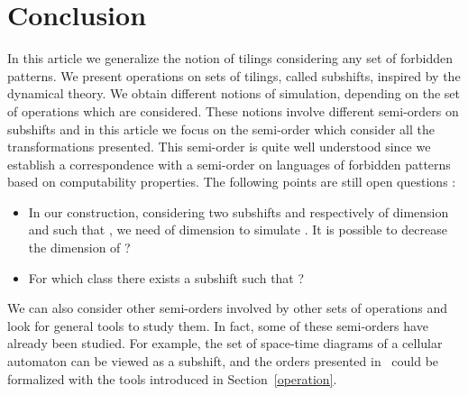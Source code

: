 \documentclass[proceedings]{stacs}
\theoremstyle{plain}\newtheorem{satz}[thm]{Satz}
\theoremstyle{definition}\newtheorem{crucial}[thm]{Crucial Definition}
\begin{document}
\section*{Conclusion}

In this article we generalize the notion of tilings considering any set of forbidden patterns. We present operations on sets of tilings, called subshifts, inspired by the dynamical theory. We obtain different notions of simulation, depending on the set of operations which are considered. These notions involve different semi-orders on subshifts and in this article we focus on the semi-order which consider all the transformations presented. This semi-order is quite well understood since we establish a correspondence with a semi-order on languages of forbidden patterns based on computability properties. The following points are still open questions :
\begin{itemize}
 \item In our construction, considering two subshifts  and  respectively of dimension  and  such that , we need  of dimension  to simulate . It is possible to decrease the dimension of ?

 \item For which class  there exists a subshift  such that ?
\end{itemize}

We can also consider other semi-orders involved by other sets of operations and look for general tools to study them. In fact, some of these semi-orders have already been studied. For example, the set of space-time diagrams of a cellular automaton can be viewed as a subshift, and the orders presented in~\cite{mazoyer1999ioc,ollinger2003stacs,theyssier2005acm} could be formalized with the tools introduced in Section~\ref{operation}. 




\end{document}
